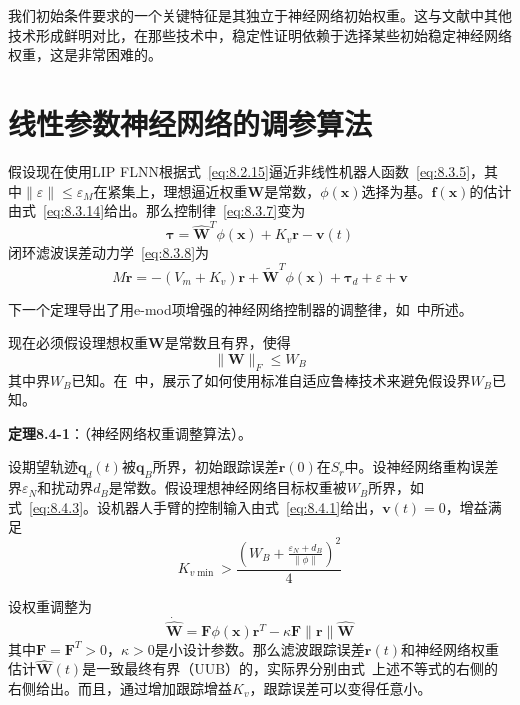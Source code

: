 \documentclass[12pt,a4paper]{ctexart}
\begin{document}
我们初始条件要求的一个关键特征是其独立于神经网络初始权重。这与文献中其他技术形成鲜明对比，在那些技术中，稳定性证明依赖于选择某些初始稳定神经网络权重，这是非常困难的。

\section{线性参数神经网络的调参算法}

假设现在使用LIP FLNN根据式~\eqref{eq:8.2.15}逼近非线性机器人函数~\eqref{eq:8.3.5}，其中$\|\varepsilon\| \leq \varepsilon_M$在紧集上，理想逼近权重$\bm{W}$是常数，$\phi(\bm{x})$选择为基。$\bm{f}(\bm{x})$的估计由式~\eqref{eq:8.3.14}给出。那么控制律~\eqref{eq:8.3.7}变为
\begin{equation}\label{eq:8.4.1}
\bm{\tau} = \hat{\bm{W}}^T \phi(\bm{x}) + K_v\bm{r} - \bm{v}(t)
\end{equation}
闭环滤波误差动力学~\eqref{eq:8.3.8}为
\begin{equation}\label{eq:8.4.2}
M\dot{\bm{r}} = -(V_m + K_v)\bm{r} + \tilde{\bm{W}}^T\phi(\bm{x}) + \bm{\tau}_d + \varepsilon + \bm{v}
\end{equation}

下一个定理导出了用e-mod项增强的神经网络控制器的调整律，如~\cite{narendra1987}中所述。

现在必须假设理想权重$\bm{W}$是常数且有界，使得
\begin{equation}\label{eq:8.4.3}
\|\bm{W}\|_F \leq W_B
\end{equation}
其中界$W_B$已知。在~\cite{polycarpou1996}中，展示了如何使用标准自适应鲁棒技术来避免假设界$W_B$已知。

\textbf{定理8.4-1}：（神经网络权重调整算法）。

设期望轨迹$\bm{q}_d(t)$被$\bm{q}_B$所界，初始跟踪误差$\bm{r}(0)$在$S_r$中。设神经网络重构误差界$\varepsilon_N$和扰动界$d_B$是常数。假设理想神经网络目标权重被$W_B$所界，如式~\eqref{eq:8.4.3}。设机器人手臂的控制输入由式~\eqref{eq:8.4.1}给出，$\bm{v}(t)=0$，增益满足
\begin{equation}
K_{v\min} > \frac{(W_B + \frac{\varepsilon_N + d_B}{\|\phi\|})^2}{4}
\end{equation}

设权重调整为
\begin{equation}
\dot{\hat{\bm{W}}} = \bm{F}\phi(\bm{x})\bm{r}^T - \kappa\bm{F}\|\bm{r}\|\hat{\bm{W}}
\end{equation}
其中$\bm{F}=\bm{F}^T>0$，$\kappa>0$是小设计参数。那么滤波跟踪误差$\bm{r}(t)$和神经网络权重估计$\hat{\bm{W}}(t)$是一致最终有界（UUB）的，实际界分别由式~上述不等式的右侧的右侧给出。而且，通过增加跟踪增益$K_v$，跟踪误差可以变得任意小。
\end{document}
